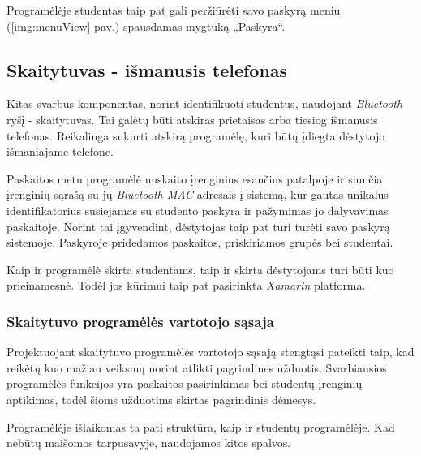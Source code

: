 \documentclass{VUMIFPSkursinis}
\begin{document}
Programėlėje studentas taip pat gali peržiūrėti savo paskyrą meniu (\ref{img:menuView} pav.) spausdamas mygtuką „Paskyra“.

\subsection{Skaitytuvas - išmanusis telefonas} \label{TeacherApp}
Kitas svarbus komponentas, norint identifikuoti studentus, naudojant \textit{Bluetooth} ryšį - skaitytuvas. Tai galėtų būti atskiras prietaisas arba tiesiog išmanusis telefonas. Reikalinga sukurti atskirą programėlę, kuri būtų įdiegta dėstytojo išmaniajame telefone.

Paskaitos metu programėlė nuskaito įrenginius esančius patalpoje ir siunčia įrenginių sąrašą su jų \textit{Bluetooth MAC} adresais į sistemą, kur gautas unikalus identifikatorius susiejamas su studento paskyra ir pažymimas jo dalyvavimas paskaitoje. Norint tai įgyvendint, dėstytojas taip pat turi turėti savo paskyrą sistemoje. Paskyroje pridedamos paskaitos, priskiriamos grupės bei studentai.

Kaip ir programėlė skirta studentams, taip ir skirta dėstytojams turi būti kuo prieinamesnė. Todėl jos kūrimui taip pat pasirinkta \textit{Xamarin} platforma.

\subsubsection{Skaitytuvo programėlės vartotojo sąsaja}

Projektuojant skaitytuvo programėlės vartotojo sąsają stengtąsi pateikti taip, kad reikėtų kuo mažiau veiksmų norint atlikti pagrindines užduotis. Svarbiausios programėlės funkcijos yra paskaitos pasirinkimas bei studentų įrenginių aptikimas, todėl šioms užduotims skirtas pagrindinis dėmesys.

Programėlėje išlaikomas ta pati struktūra, kaip ir studentų programėlėje. Kad nebūtų maišomos tarpusavyje, naudojamos kitos spalvos.
\end{document}
